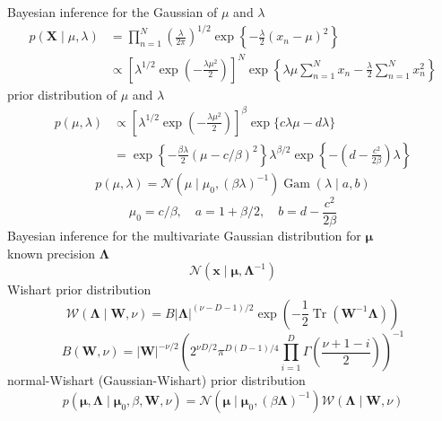 \documentclass{article}
\begin{document}
	Bayesian inference for the Gaussian of $\mu$ and $\lambda$
	$$
	\begin{aligned}
	p(\mathbf{X} \mid \mu, \lambda)&=\prod_{n=1}^{N}\left(\frac{\lambda}{2 \pi}\right)^{1 / 2} \exp \left\{-\frac{\lambda}{2}\left(x_{n}-\mu\right)^{2}\right\} \\
	&\propto\left[\lambda^{1 / 2} \exp \left(-\frac{\lambda \mu^{2}}{2}\right)\right]^{N} \exp \left\{\lambda \mu \sum_{n=1}^{N} x_{n}-\frac{\lambda}{2} \sum_{n=1}^{N} x_{n}^{2}\right\}
	\end{aligned}
	$$
	prior distribution of $\mu$ and $\lambda$ 
	$$
	\begin{aligned}
	p(\mu, \lambda) &\propto\left[\lambda^{1 / 2} \exp \left(-\frac{\lambda \mu^{2}}{2}\right)\right]^{\beta} \exp \{c \lambda \mu-d \lambda\} \\
	&=\exp \left\{-\frac{\beta \lambda}{2}(\mu-c / \beta)^{2}\right\} \lambda^{\beta / 2} \exp \left\{-\left(d-\frac{c^{2}}{2 \beta}\right) \lambda\right\}
	\end{aligned}
	$$
	$$
	p(\mu, \lambda)=\mathcal{N}\left(\mu \mid \mu_{0},(\beta \lambda)^{-1}\right) \operatorname{Gam}(\lambda \mid a, b)
	$$
	$$
	\mu_{0}=c / \beta, \quad a=1+\beta / 2, \quad b=d-\frac{c^{2}}{2\beta}
	$$
	Bayesian inference for the multivariate Gaussian distribution for $\boldsymbol{\mu}$ \\
	known precision $\boldsymbol{\Lambda}$
	$$
	\mathcal{N}\left(\mathbf{x} \mid \boldsymbol{\mu}, \boldsymbol{\Lambda}^{-1}\right)
	$$
	Wishart prior distribution
	$$
	\mathcal{W}(\boldsymbol{\Lambda} \mid \mathbf{W}, \nu)=B|\boldsymbol{\Lambda}|^{(\nu-D-1) / 2} \exp \left(-\frac{1}{2} \operatorname{Tr}\left(\mathbf{W}^{-1} \boldsymbol{\Lambda}\right)\right)
	$$
	$$
	B(\mathbf{W}, \nu)=|\mathbf{W}|^{-\nu / 2}\left(2^{\nu D / 2} \pi^{D(D-1) / 4} \prod_{i=1}^{D} \Gamma\left(\frac{\nu+1-i}{2}\right)\right)^{-1}
	$$
	normal-Wishart (Gaussian-Wishart) prior distribution
	$$
	p\left(\boldsymbol{\mu}, \boldsymbol{\Lambda} \mid \boldsymbol{\mu}_{0}, \beta, \mathbf{W}, \nu\right)=\mathcal{N}\left(\boldsymbol{\mu} \mid \boldsymbol{\mu}_{0},(\beta \boldsymbol{\Lambda})^{-1}\right) \mathcal{W}(\boldsymbol{\Lambda} \mid \mathbf{W}, \nu)
	$$
	
	\pagebreak
\end{document}
